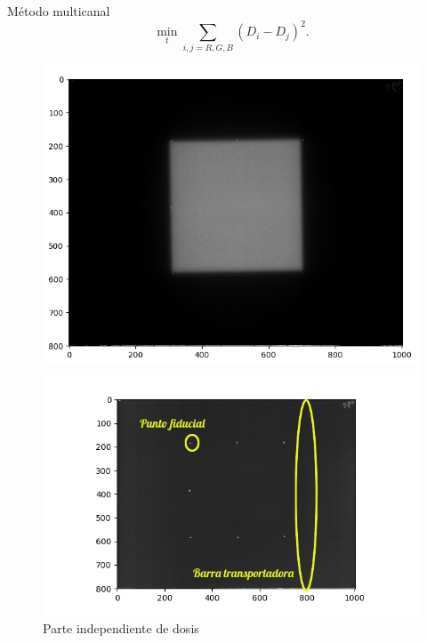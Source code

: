 \documentclass[12pt]{beamer}
\begin{document}
\begin{frame}{Método multicanal}
\begin{equation*}
\min_{t}\sum_{i,j=R,G,B}(D_i-D_j)^2.
\end{equation*}

\begin{figure}[htp]%
	\centering
	\begin{minipage}{0.4\textwidth}
		\includegraphics[width=\textwidth]{images/mapaCuadradoConMulticanal.png}
		\caption{Mapa cuadrado con separación multicanal}
	\end{minipage}\hfill
	\begin{minipage}{0.6\textwidth}
		\includegraphics[width=\textwidth]{images/fondoCuadradoConLabel.png}
		\caption{Parte independiente de dosis}
	\end{minipage}
	
\end{figure}
\end{frame}
\end{document}
